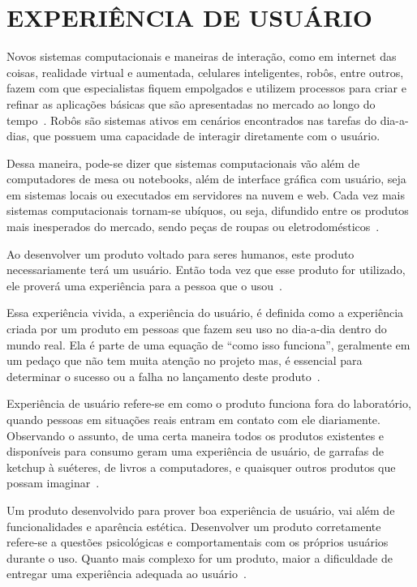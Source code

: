 \chapter{EXPERIÊNCIA DE USUÁRIO}
\label{cap:ux}
Novos sistemas computacionais e maneiras de interação, como em internet das coisas, realidade virtual e aumentada, celulares inteligentes, robôs, entre outros, fazem com que especialistas fiquem empolgados e utilizem processos para criar e refinar as aplicações básicas que são apresentadas no mercado ao longo do tempo~\cite{hartson:2012}. Robôs são sistemas ativos em cenários encontrados nas tarefas do dia-a-dias, que possuem uma capacidade de interagir diretamente com o usuário.

Dessa maneira, pode-se dizer que sistemas computacionais vão além de computadores de mesa ou notebooks, além de interface gráfica com usuário, seja em sistemas locais ou executados em servidores na nuvem e web. Cada vez mais sistemas computacionais tornam-se ubíquos, ou seja, difundido entre os produtos mais inesperados do mercado, sendo peças de roupas ou eletrodomésticos~\cite{hartson:2012}.

Ao desenvolver um produto voltado para seres humanos, este produto necessariamente terá um usuário. Então toda vez que esse produto for utilizado, ele proverá uma experiência para a pessoa que o usou~\cite{garrett:2010}.

Essa experiência vivida, a experiência do usuário, é definida como a experiência criada por um produto em pessoas que fazem seu uso no dia-a-dia dentro do mundo real. Ela é parte de uma equação de ``como isso funciona'', geralmente em um pedaço que não tem muita atenção no projeto mas, é essencial para determinar o sucesso ou a falha no lançamento deste produto~\cite{garrett:2010}.

Experiência de usuário refere-se em como o produto funciona fora do laboratório, quando pessoas em situações reais entram em contato com ele diariamente. Observando o assunto, de uma certa maneira todos os produtos existentes e disponíveis para consumo geram uma experiência de usuário, de garrafas de ketchup à suéteres, de livros a computadores, e quaisquer outros produtos que possam imaginar~\cite{garrett:2010, albert:2013}.

Um produto desenvolvido para prover boa experiência de usuário, vai além de funcionalidades e aparência estética. Desenvolver um produto corretamente refere-se a questões psicológicas e comportamentais com os próprios usuários durante o uso. Quanto mais complexo for um produto, maior a dificuldade de entregar uma experiência adequada ao usuário~\cite{garrett:2010, allen:2012}.

